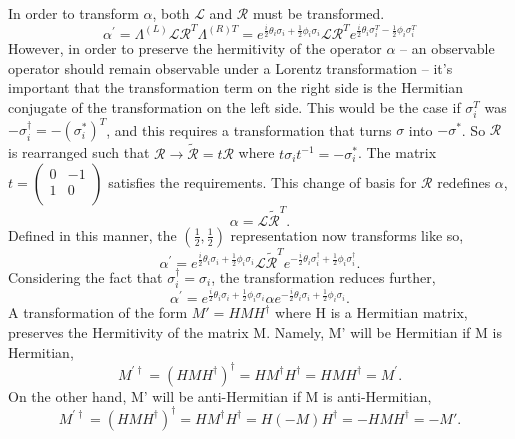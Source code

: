 In order to transform $\alpha$, both $\mathcal{L}$ and $\mathcal{R}$ must be transformed.
\begin{equation}
\alpha^{'} = \Lambda^{(L)} \mathcal{L} \mathcal{R}^T \Lambda^{(R)T} 
 = e^{\frac{i}{2}\theta_i \sigma_i + \frac{1}{2}\phi_i \sigma_i} \mathcal{L} \mathcal{R}^T e^{\frac{i}{2}\theta_i \sigma_i^T - \frac{1}{2}\phi_i \sigma_i^T} 
\end{equation}
However, in order to preserve the hermitivity of the operator $\alpha$ -- an observable operator should remain observable under a Lorentz transformation -- it's important that the transformation term on the right side is the Hermitian conjugate of the transformation on the left side. This would be the case if $\sigma_i^T$ was $-\sigma_i^{\dagger} = -(\sigma_i^{*})^{T}$, and this requires a transformation that turns $\sigma$ into $-\sigma^{*}$. So $\mathcal{R}$ is rearranged such that $\mathcal{R} \rightarrow \tilde{\mathcal{R}} = t\mathcal{R}$ where $t\sigma_i t^{-1} = -\sigma_i^{*}$. The matrix $t = \left( \begin{smallmatrix} 0 & -1 \\ 1 & 0 \\ \end{smallmatrix} \right)$ satisfies the requirements. This change of basis for $\mathcal{R}$ redefines $\alpha$,
\begin{equation}
\alpha = \mathcal{L}\tilde{\mathcal{R}}^T.
\end{equation}
Defined in this manner, the $(\frac{1}{2}, \frac{1}{2})$ representation now transforms like so,
\begin{equation}
\alpha^{'} = e^{\frac{i}{2}\theta_i \sigma_i + \frac{1}{2}\phi_i \sigma_i} 
\mathcal{L}\tilde{\mathcal{R}}^T e^{-\frac{i}{2}\theta_i \sigma_i^\dagger + \frac{1}{2}\phi_i \sigma_i^\dagger}.
\end{equation}
Considering the fact that $\sigma_i^\dagger = \sigma_i$, the transformation reduces further,
\begin{equation}
\alpha^{'} = e^{\frac{i}{2}\theta_i \sigma_i + \frac{1}{2}\phi_i \sigma_i} 
\alpha e^{-\frac{i}{2}\theta_i \sigma_i + \frac{1}{2}\phi_i \sigma_i}.
\end{equation}
A transformation of the form $M' = HMH^\dagger$ where H is a Hermitian matrix, preserves the Hermitivity of the matrix M. Namely, M' will be Hermitian if M is Hermitian, 
\begin{equation}
M^{'\dagger} = (HMH^\dagger)^\dagger = HM^\dagger H^\dagger = HMH^\dagger = M^{'}.
\end{equation}
On the other hand, M' will be anti-Hermitian if M is anti-Hermitian,
\begin{equation}
M^{'\dagger} = (HMH^\dagger)^\dagger = HM^\dagger H^\dagger = H(-M)H^\dagger = -HMH^\dagger = -M'.
\end{equation}

